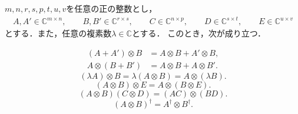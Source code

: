 \begin{theo}[テンソル積の性質]
  \label{theo:matrix-tensor-product-properties}
  $m,n,r,s,p,t,u,v$を任意の正の整数とし，
  \[
    \begin{gathered}
      A,A'\in\mathbb{C}^{m\times n},\qquad
      B,B'\in\mathbb{C}^{r\times s}, \qquad
      C\in\mathbb{C}^{n\times p},\qquad
      D\in\mathbb{C}^{s\times t},\qquad
      E\in\mathbb{C}^{u\times v}
    \end{gathered}
  \]
  とする．また，任意の複素数$\lambda\in\mathbb{C}$とする．
  このとき，次が成り立つ．

  \begin{equation*}
    \begin{aligned}
      (A+A')\otimes B & =A\otimes B+A'\otimes B, \\
      A\otimes(B+B')  & =A\otimes B+A\otimes B'.
    \end{aligned}
  \end{equation*}
  \begin{equation*}
    (\lambda A)\otimes B
    =\lambda(A\otimes B)
    =A\otimes(\lambda B).
  \end{equation*}
  \begin{equation}
    (A\otimes B)\otimes E=A\otimes(B\otimes E).
    \label{eq:tensor-product-associativity}
  \end{equation}
  \begin{equation}
    (A\otimes B)(C\otimes D)=(AC)\otimes(BD).
    \label{eq:tensor-product-mixed-product}
  \end{equation}
  \begin{equation*}
    (A\otimes B)^\dagger=A^\dagger\otimes B^\dagger.
  \end{equation*}
\end{theo}
